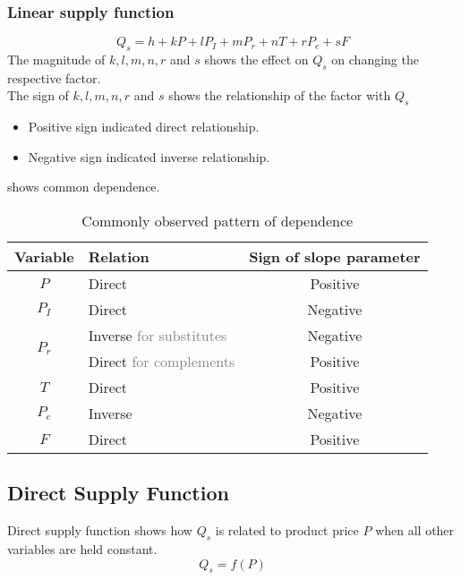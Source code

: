 \documentclass[oneside]{book}
\begin{document}
\subsubsection{Linear supply function}
\[
	Q_s = h + kP + lP_I + mP_r + nT + rP_e + sF
\]
\noindent The magnitude of \(k, l, m, n, r\) and \(s\) shows the effect on \(Q_s\) on changing the respective factor.
\\
\noindent The sign of \(k, l, m, n, r\) and \(s\) shows the relationship of the factor with \(Q_s\)
\begin{itemize}
	\item Positive sign indicated direct relationship.
	\item Negative sign indicated inverse relationship.
\end{itemize}
 shows common dependence.
\begin{table}[ht]
	\centering
	\begin{tabular}{|c|l|c|}
		\hline
		\textbf{Variable}        & \textbf{Relation}                         & \textbf{Sign of slope parameter} \\
		\hline
		\(P\)                    & Direct                                    & Positive                         \\
		\hline
		\(P_I\)                  & Direct                                    & Negative                         \\
		\hline
		\multirow{2}{*}{\(P_r\)} & Inverse \textcolor{gray}{for substitutes} & Negative                         \\
		\cline{2-3}
		{}                       & Direct \textcolor{gray}{for complements}  & Positive                         \\
		\hline
		\(T\)                    & Direct                                    & Positive                         \\
		\hline
		\(P_e\)                  & Inverse                                   & Negative                         \\
		\hline
		\(F\)                    & Direct                                    & Positive                         \\
		\hline
	\end{tabular}
	\caption{Commonly observed pattern of dependence}
	\label{pattern_of_slopes_in_supply}
\end{table}

\subsection{Direct Supply Function}
Direct supply function shows how \(Q_s\) is related to product price \(P\) when all other variables are held constant.
\[
	Q_s = f(P)
\]
\end{document}
